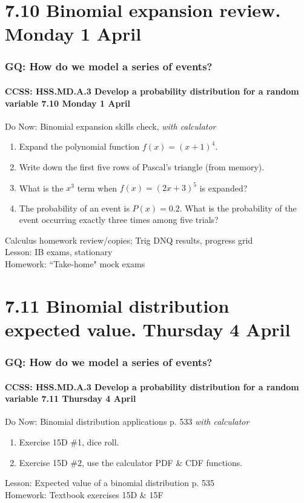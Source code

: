 \documentclass{beamer}
\begin{document}
\section{7.10 Binomial expansion review. Monday 1 April}
  \frame
  {
    \frametitle{GQ: How do we model a series of events?}
    \framesubtitle{CCSS: HSS.MD.A.3 Develop a probability distribution for a random variable \hfill \alert{7.10 Monday 1 April}}

    \begin{block}{Do Now: Binomial expansion skills check, \emph{with calculator}}
    \begin{enumerate}
      \item Expand the polynomial function $f(x)=(x+1)^4$.
      \item Write down the first five rows of Pascal's triangle (from memory).
      \item What is the $x^3$ term when $f(x)=(2x+3)^5$ is expanded?
      \item The probability of an event is $P(x)=0.2$. What is the probability of the event occurring exactly three times among five trials?
    \end{enumerate}
    \end{block}
    Calculus homework review/copies; Trig DNQ results, progress grid\\
    Lesson: IB exams, stationary\\
    Homework: ``Take-home" mock exams
  }

\section{7.11 Binomial distribution expected value. Thursday 4 April}
  \frame
  {
    \frametitle{GQ: How do we model a series of events?}
    \framesubtitle{CCSS: HSS.MD.A.3 Develop a probability distribution for a random variable \hfill \alert{7.11 Thursday 4 April}}

    \begin{block}{Do Now: Binomial distribution applications p. 533 \emph{with calculator}}
    \begin{enumerate}
      \item Exercise 15D \#1, dice roll.
      \item Exercise 15D \#2, use the calculator PDF \& CDF functions.
    \end{enumerate}
    \end{block}
    Lesson: Expected value of a binomial distribution p. 535\\
    Homework: Textbook exercises 15D \& 15F
  }
\end{document}

